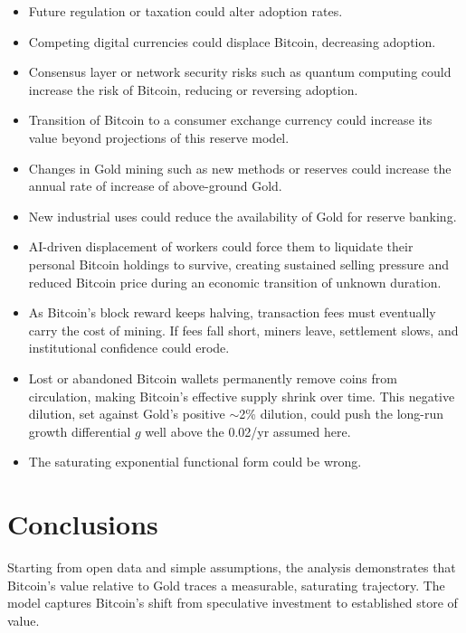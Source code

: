 \documentclass[11pt,letterpaper]{article}
\begin{document}
\begin{itemize}
    \item Future regulation or taxation could alter adoption rates.
    \item Competing digital currencies could displace Bitcoin, decreasing adoption.
    \item Consensus layer or network security risks such as quantum computing could increase the risk of Bitcoin, reducing or reversing adoption.
    \item Transition of Bitcoin to a consumer exchange currency could increase its value beyond projections of this reserve model.
    \item Changes in Gold mining such as new methods or reserves could increase the annual rate of increase of above-ground Gold.
    \item New industrial uses could reduce the availability of Gold for reserve banking.
    \item AI-driven displacement of workers could force them to liquidate their personal Bitcoin holdings to survive, creating sustained selling pressure and reduced Bitcoin price during an economic transition of unknown duration.
    \item As Bitcoin's block reward keeps halving, transaction fees must eventually carry the cost of mining. If fees fall short, miners leave, settlement slows, and institutional confidence could erode.
    \item Lost or abandoned Bitcoin wallets permanently remove coins from circulation, making Bitcoin's effective supply shrink over time. This negative dilution, set against Gold's positive $\sim$2\% dilution, could push the long-run growth differential $g$ well above the 0.02/yr assumed here.
    \item The saturating exponential functional form could be wrong.
\end{itemize}

\section{Conclusions}

Starting from open data and simple assumptions, the analysis demonstrates that Bitcoin's value relative to Gold traces a measurable, saturating trajectory. The model captures Bitcoin's shift from speculative investment to established store of value.
\end{document}
